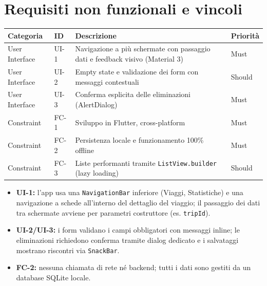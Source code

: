 \documentclass[11pt, a4paper]{article}
\begin{document}
\section{Requisiti non funzionali e vincoli}

\begin{table}[h!]
    \centering
    \renewcommand{\arraystretch}{1.3}
    \begin{tabularx}{\textwidth}{>{\raggedright\arraybackslash}p{2.6cm} l X l}
        \toprule
        \textbf{Categoria} & \textbf{ID} & \textbf{Descrizione} & \textbf{Priorità} \\
        \midrule
        User Interface & UI-1 & Navigazione a più schermate con passaggio dati e feedback visivo (Material 3) & Must \\
        User Interface & UI-2 & Empty state e validazione dei form con messaggi contestuali & Should \\
        User Interface & UI-3 & Conferma esplicita delle eliminazioni (AlertDialog) & Must \\
        Constraint & FC-1 & Sviluppo in Flutter, cross-platform & Must \\
        Constraint & FC-2 & Persistenza locale e funzionamento 100\% offline & Must \\
        Constraint & FC-3 & Liste performanti tramite \texttt{ListView.builder} (lazy loading) & Should \\
        \bottomrule
    \end{tabularx}
\end{table}

\begin{itemize}[nosep]
    \item \textbf{UI-1:} l'app usa una \texttt{NavigationBar} inferiore (Viaggi,
    Statistiche) e una navigazione a schede all'interno del dettaglio del viaggio; il
    passaggio dei dati tra schermate avviene per parametri costruttore (es. \texttt{tripId}).
    \item \textbf{UI-2/UI-3:} i form validano i campi obbligatori con messaggi inline; le
    eliminazioni richiedono conferma tramite dialog dedicato e i salvataggi mostrano
    riscontri via \texttt{SnackBar}.
    \item \textbf{FC-2:} nessuna chiamata di rete né backend; tutti i dati sono gestiti da
    un database SQLite locale.
\end{itemize}
\end{document}
